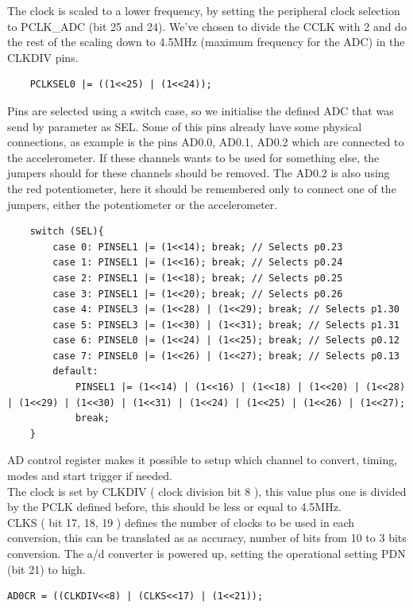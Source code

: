 The clock is scaled to a lower frequency, by setting the peripheral clock selection to PCLK\_ADC (bit 25 and 24). We've chosen to divide the CCLK with 2 and do the rest of the scaling down to 4.5MHz (maximum frequency for the ADC) in the CLKDIV pins.
\begin{lstlisting} 
	PCLKSEL0 |= ((1<<25) | (1<<24));
 \end{lstlisting}


Pins are selected using a switch case, so we initialise the defined ADC that was send by parameter as SEL. Some of this pins already have some physical connections, as example is the pins AD0.0, AD0.1, AD0.2 which are connected to the accelerometer. If these channels wants to be used for something else, the jumpers should for these channels should be removed. The AD0.2 is also using the red potentiometer, here it should be remembered only to connect one of the jumpers, either the potentiometer or the accelerometer.

\begin{lstlisting}
	switch (SEL){
		case 0: PINSEL1 |= (1<<14); break; // Selects p0.23
		case 1: PINSEL1 |= (1<<16); break; // Selects p0.24
		case 2: PINSEL1 |= (1<<18); break; // Selects p0.25
		case 3: PINSEL1 |= (1<<20); break; // Selects p0.26
		case 4: PINSEL3 |= (1<<28) | (1<<29); break; // Selects p1.30
		case 5: PINSEL3 |= (1<<30) | (1<<31); break; // Selects p1.31
		case 6: PINSEL0 |= (1<<24) | (1<<25); break; // Selects p0.12
		case 7: PINSEL0 |= (1<<26) | (1<<27); break; // Selects p0.13
		default:
			PINSEL1 |= (1<<14) | (1<<16) | (1<<18) | (1<<20) | (1<<28) | (1<<29) | (1<<30) | (1<<31) | (1<<24) | (1<<25) | (1<<26) | (1<<27);
			break;
	}
\end{lstlisting}


A\/D control register makes it possible to setup which channel to convert, timing, modes and start trigger if needed. \\
The clock is set by CLKDIV ( clock division bit 8 ), this value plus one is divided by the PCLK defined before, this should be less or equal to 4.5MHz. \\
CLKS ( bit 17, 18, 19 ) defines the number of clocks to be used in each conversion, this can be translated as as accuracy, number of bits from 10 to 3 bits conversion.
The a/d converter is powered up, setting the  operational setting PDN (bit 21) to high.

\begin{lstlisting}
AD0CR = ((CLKDIV<<8) | (CLKS<<17) | (1<<21));
\end{lstlisting}

